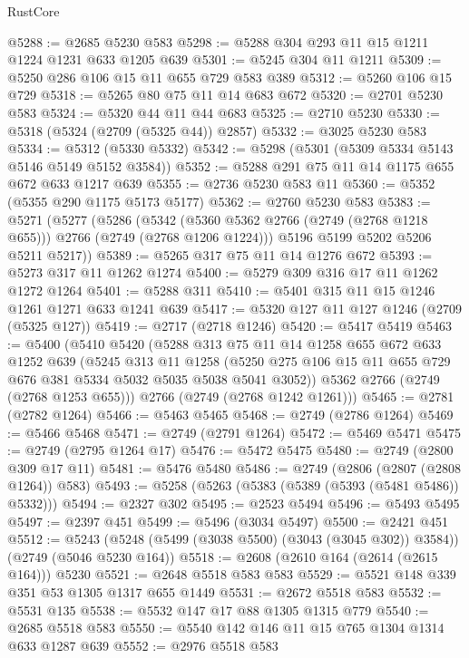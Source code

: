 \begin{lexlean}{RustCore}
\begin{coremodule}
@5288 := @2685 @5230 @583
@5298 := @5288 @304 @293 @11 @15 @1211 @1224 @1231 @633 @1205 @639
@5301 := @5245 @304 @11 @1211
@5309 := @5250 @286 @106 @15 @11 @655 @729 @583 @389
@5312 := @5260 @106 @15 @729
@5318 := @5265 @80 @75 @11 @14 @683 @672
@5320 := @2701 @5230 @583
@5324 := @5320 @44 @11 @44 @683
@5325 := @2710 @5230
@5330 := @5318 (@5324 (@2709 (@5325 @44)) @2857)
@5332 := @3025 @5230 @583
@5334 := @5312 (@5330 @5332)
@5342 := @5298 (@5301 (@5309 @5334 @5143 @5146 @5149 @5152 @3584))
@5352 := @5288 @291 @75 @11 @14 @1175 @655 @672 @633 @1217 @639
@5355 := @2736 @5230 @583 @11
@5360 := @5352 (@5355 @290 @1175 @5173 @5177)
@5362 := @2760 @5230 @583
@5383 := @5271
    (@5277
      (@5286
        (@5342 (@5360 @5362 @2766 (@2749 (@2768 @1218 @655))) @2766 (@2749 (@2768 @1206 @1224)))
        @5196
        @5199
        @5202
        @5206
        @5211
        @5217))
@5389 := @5265 @317 @75 @11 @14 @1276 @672
@5393 := @5273 @317 @11 @1262 @1274
@5400 := @5279 @309 @316 @17 @11 @1262 @1272 @1264
@5401 := @5288 @311
@5410 := @5401 @315 @11 @15 @1246 @1261 @1271 @633 @1241 @639
@5417 := @5320 @127 @11 @127 @1246 (@2709 (@5325 @127))
@5419 := @2717 (@2718 @1246)
@5420 := @5417 @5419
@5463 := @5400
    (@5410
      @5420
      (@5288
        @313
        @75
        @11
        @14
        @1258
        @655
        @672
        @633
        @1252
        @639
        (@5245
          @313
          @11
          @1258
          (@5250 @275 @106 @15 @11 @655 @729 @676 @381 @5334 @5032 @5035 @5038 @5041 @3052))
        @5362
        @2766
        (@2749 (@2768 @1253 @655)))
      @2766
      (@2749 (@2768 @1242 @1261)))
@5465 := @2781 (@2782 @1264)
@5466 := @5463 @5465
@5468 := @2749 (@2786 @1264)
@5469 := @5466 @5468
@5471 := @2749 (@2791 @1264)
@5472 := @5469 @5471
@5475 := @2749 (@2795 @1264 @17)
@5476 := @5472 @5475
@5480 := @2749 (@2800 @309 @17 @11)
@5481 := @5476 @5480
@5486 := @2749 (@2806 (@2807 (@2808 @1264)) @583)
@5493 := @5258 (@5263 (@5383 (@5389 (@5393 (@5481 @5486)) @5332)))
@5494 := @2327 @302
@5495 := @2523 @5494
@5496 := @5493 @5495
@5497 := @2397 @451
@5499 := @5496 (@3034 @5497)
@5500 := @2421 @451
@5512 := @5243 (@5248 (@5499 (@3038 @5500) (@3043 (@3045 @302)) @3584)) (@2749 (@5046 @5230 @164))
@5518 := @2608 (@2610 @164 (@2614 (@2615 @164))) @5230
@5521 := @2648 @5518 @583 @583
@5529 := @5521 @148 @339 @351 @53 @1305 @1317 @655 @1449
@5531 := @2672 @5518 @583
@5532 := @5531 @135
@5538 := @5532 @147 @17 @88 @1305 @1315 @779
@5540 := @2685 @5518 @583
@5550 := @5540 @142 @146 @11 @15 @765 @1304 @1314 @633 @1287 @639
@5552 := @2976 @5518 @583

\end{coremodule}
\end{lexlean}
